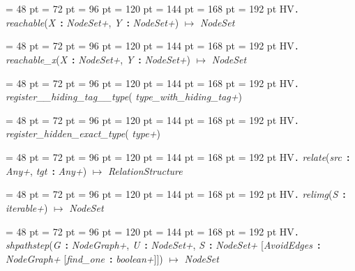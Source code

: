 {{{{\par \noindent  \leftskip = 48 pt  \leftmargini = 72 pt  \leftmarginii = 96 pt  \leftmarginiii = 120 pt  \leftmarginiv = 144 pt  \leftmarginv = 168 pt  \leftmarginvi = 192 pt HV{\large {\tt .\/} {\em reachable\/}}({\em X\/}~{\bf :}  {\em NodeSet+\/}, {\em Y\/}~{\bf :}  {\em NodeSet+\/}) \(\mapsto \)  {\em NodeSet\/}\par}
{\par \noindent  \leftskip = 48 pt  \leftmargini = 72 pt  \leftmarginii = 96 pt  \leftmarginiii = 120 pt  \leftmarginiv = 144 pt  \leftmarginv = 168 pt  \leftmarginvi = 192 pt HV{\large {\tt .\/} {\em reachable{\_}x\/}}({\em X\/}~{\bf :}  {\em NodeSet+\/}, {\em Y\/}~{\bf :}  {\em NodeSet+\/}) \(\mapsto \)  {\em NodeSet\/}\par}
{\par \noindent  \leftskip = 48 pt  \leftmargini = 72 pt  \leftmarginii = 96 pt  \leftmarginiii = 120 pt  \leftmarginiv = 144 pt  \leftmarginv = 168 pt  \leftmarginvi = 192 pt HV{\large {\tt .\/} {\em register{\_}{\_}hiding{\_}tag{\_}{\_}type\/}}( {\em type{\_}with{\_}hiding{\_}tag+\/})\par}
{\par \noindent  \leftskip = 48 pt  \leftmargini = 72 pt  \leftmarginii = 96 pt  \leftmarginiii = 120 pt  \leftmarginiv = 144 pt  \leftmarginv = 168 pt  \leftmarginvi = 192 pt HV{\large {\tt .\/} {\em register{\_}hidden{\_}exact{\_}type\/}}( {\em type+\/})\par}
{\par \noindent  \leftskip = 48 pt  \leftmargini = 72 pt  \leftmarginii = 96 pt  \leftmarginiii = 120 pt  \leftmarginiv = 144 pt  \leftmarginv = 168 pt  \leftmarginvi = 192 pt HV{\large {\tt .\/} {\em relate\/}}({\em src\/}~{\bf :}  {\em Any+\/}, {\em tgt\/}~{\bf :}  {\em Any+\/}) \(\mapsto \)  {\em RelationStructure\/}\par}
{\par \noindent  \leftskip = 48 pt  \leftmargini = 72 pt  \leftmarginii = 96 pt  \leftmarginiii = 120 pt  \leftmarginiv = 144 pt  \leftmarginv = 168 pt  \leftmarginvi = 192 pt HV{\large {\tt .\/} {\em relimg\/}}({\em S\/}~{\bf :}  {\em iterable+\/}) \(\mapsto \)  {\em NodeSet\/}\par}
{\par \noindent  \leftskip = 48 pt  \leftmargini = 72 pt  \leftmarginii = 96 pt  \leftmarginiii = 120 pt  \leftmarginiv = 144 pt  \leftmarginv = 168 pt  \leftmarginvi = 192 pt HV{\large {\tt .\/} {\em shpathstep\/}}({\em G\/}~{\bf :}  {\em NodeGraph+\/}, {\em U\/}~{\bf :}  {\em NodeSet+\/}, {\em S\/}~{\bf :}  {\em NodeSet+\/}  {[}{\em AvoidEdges\/}~{\bf :}  {\em NodeGraph+\/}  {[}{\em find{\_}one\/}~{\bf :}  {\em boolean+\/}]]) \(\mapsto \)  {\em NodeSet\/}\par}
}}}

